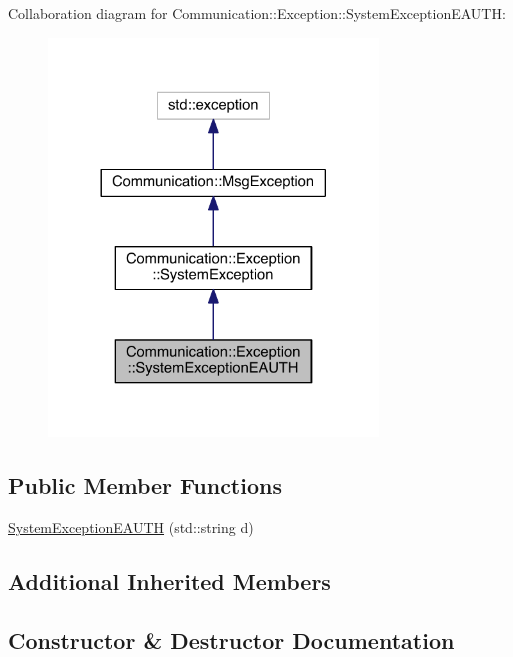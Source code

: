 Collaboration diagram for Communication\+:\+:Exception\+:\+:System\+Exception\+E\+A\+U\+T\+H\+:\nopagebreak
\begin{figure}[H]
\begin{center}
\leavevmode
\includegraphics[width=248pt]{class_communication_1_1_exception_1_1_system_exception_e_a_u_t_h__coll__graph}
\end{center}
\end{figure}
\subsection*{Public Member Functions}
\begin{DoxyCompactItemize}
\item 
\hyperlink{class_communication_1_1_exception_1_1_system_exception_e_a_u_t_h_a8d6818a7e804e907ce3c1c07e5d62933}{System\+Exception\+E\+A\+U\+T\+H} (std\+::string d)
\end{DoxyCompactItemize}
\subsection*{Additional Inherited Members}


\subsection{Constructor \& Destructor Documentation}
\hypertarget{class_communication_1_1_exception_1_1_system_exception_e_a_u_t_h_a8d6818a7e804e907ce3c1c07e5d62933}{}
